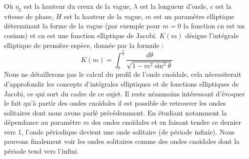 Où $\eta_2$ est la hauteur du creux de la vague, $\lambda$ est la longueur d'onde, $c$ est la vitesse de phase, $H$ est la hauteur de la vague, $m$ est un paramètre elliptique déterminant la forme de la vague (par exemple pour $m=0$ la fonction cn est un cosinus) et cn est une fonction elliptique de Jacobi.
$K(m)$ désigne l'intégrale elliptique de première espèce, donnée par la formule :
$$K(m) = \int_{0}^{\frac{\pi}{2}} \frac{d\theta}{\sqrt{1 - m^2\sin^2\theta}}$$
Nous ne détaillerons pas le calcul du profil de l'onde cnoïdale, cela nécessiterait d'approfondir les concepts d'intégrales elliptiques et de fonctions elliptiques de Jacobi, ce qui sort du cadre de ce sujet.
Il reste néanmoins intéressant d'évoquer le fait qu'à partir des ondes cnoïdales il est possible de retrouver les ondes solitaires dont nous avons parlé précédemment. 
En étudiant notamment la dépendance au paramètre $m$ des ondes cnoïdales et en faisant tendre ce dernier vers 1, l'onde périodique devient une onde solitaire (de période infinie). Nous pouvons finalement voir les ondes solitaires comme des ondes cnoïdales dont la période tend vers l'infini.

